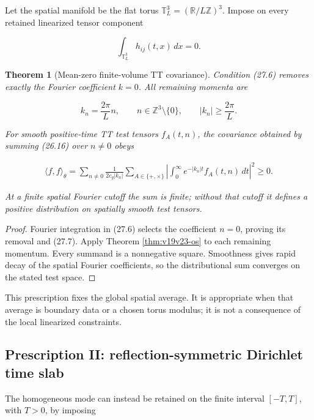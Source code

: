 \documentclass[11pt]{article}
\newtheorem{theorem}{Theorem}[section]
\theoremstyle{remark}
\begin{document}
Let the spatial manifold be the flat torus
\(\mathbb T_L^3=(\mathbb R/L\mathbb Z)^3\).  Impose on every retained
linearized tensor component

\[
 \int_{\mathbb T_L^3}h_{ij}(t,x)\,dx=0.                        \tag{27.6}
\]

\begin{theorem}[Mean-zero finite-volume TT covariance]
\label{thm:v19v24-mean-zero}
Condition (27.6) removes exactly the Fourier coefficient \(k=0\).
All remaining momenta are

\[
 k_n=\frac{2\pi}{L}n,\qquad
 n\in\mathbb Z^3\setminus\{0\},\qquad
 |k_n|\geq\frac{2\pi}{L}.                                     \tag{27.7}
\]

For smooth positive-time TT test tensors \(f_A(t,n)\), the covariance
obtained by summing (26.16) over \(n\neq0\) obeys

\[
 \begin{split}
 \langle f,f\rangle_\theta
 =\sum_{n\neq0}\frac1{2c_g|k_n|}
 \sum_{A\in\{+,\times\}}
 \left|
 \int_0^\infty e^{-|k_n|t}f_A(t,n)\,dt
 \right|^2
 \geq0.                                                       \tag{27.8}
 \end{split}
\]

At a finite spatial Fourier cutoff the sum is finite; without that cutoff
it defines a positive distribution on spatially smooth test tensors.
\end{theorem}

\begin{proof}
Fourier integration in (27.6) selects the coefficient \(n=0\), proving
its removal and (27.7).  Apply Theorem \ref{thm:v19v23-os} to each
remaining momentum.  Every summand is a nonnegative square.  Smoothness
gives rapid decay of the spatial Fourier coefficients, so the
distributional sum converges on the stated test space.
\end{proof}

This prescription fixes the global spatial average.  It is appropriate
when that average is boundary data or a chosen torus modulus; it is not a
consequence of the local linearized constraints.

\subsection{Prescription II: reflection-symmetric Dirichlet time slab}

The homogeneous mode can instead be retained on the finite interval
\([-T,T]\), with \(T>0\), by imposing
\end{document}
